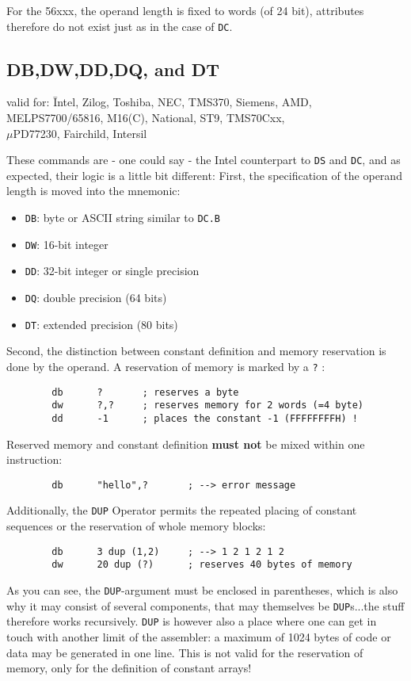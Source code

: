 \documentclass[12pt,twoside]{report}
\makeatletter
\newcommand{\bb}[1]{{\bf #1}}
\newcommand{\tty}[1]{{\tt #1}}
\newcommand{\ttindex}[1]{\index{#1@{\tt #1}}}
\makeatother
\begin{document}
For the 56xxx, the operand length is fixed to words (of 24 bit),
attributes therefore do not exist just as in the case of \tty{DC}.


\subsection{DB,DW,DD,DQ, and DT}
\ttindex{DB}\ttindex{DW}\ttindex{DD}\ttindex{DQ}\ttindex{DT}

{\em\begin{tabbing}
valid for: \= Intel, Zilog, Toshiba, NEC, TMS370, Siemens, AMD, \\
           \> MELPS7700/65816, M16(C), National, ST9, TMS70Cxx, \\
           \> $\mu$PD77230, Fairchild, Intersil
\end{tabbing}}

These commands are - one could say - the Intel counterpart to \tty{DS} and
\tty{DC}, and as expected, their logic is a little bit different: First,
the specification of the operand length is moved into the mnemonic:
\begin{itemize}
\item{\tty{DB}: byte or ASCII string similar to \tty{DC.B}}
\item{\tty{DW}: 16-bit integer}
\item{\tty{DD}: 32-bit integer or single precision}
\item{\tty{DQ}: double precision   (64 bits)}
\item{\tty{DT}: extended precision (80 bits)}
\end{itemize}
Second, the distinction between constant definition and memory
reservation is done by the operand.  A reservation of memory is
marked by a \tty{?} :
\begin{verbatim}
        db      ?       ; reserves a byte
        dw      ?,?     ; reserves memory for 2 words (=4 byte)
        dd      -1      ; places the constant -1 (FFFFFFFFH) !
\end{verbatim}
Reserved memory and constant definition \bb{must not} be mixed within one
instruction:
\begin{verbatim}
        db      "hello",?       ; --> error message
\end{verbatim}
Additionally, the \tty{DUP} Operator permits the repeated placing of
constant sequences or the reservation of whole memory blocks:
\begin{verbatim}
        db      3 dup (1,2)     ; --> 1 2 1 2 1 2
        dw      20 dup (?)      ; reserves 40 bytes of memory
\end{verbatim}
As you can see, the \tty{DUP}-argument must be enclosed in parentheses,
which is also why it may consist of several components, that may
themselves be \tty{DUP}s...the stuff therefore works recursively. 
\tty{DUP} is however also a place where one can get in touch with another
limit of the assembler: a maximum of 1024 bytes of code or data may be
generated in one line.  This is not valid for the reservation of memory,
only for the definition of constant arrays!
\end{document}
